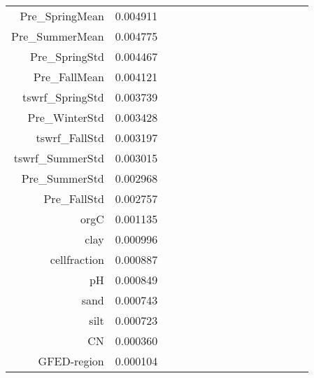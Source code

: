 \begin{table}[h]
\begin{tabular}{rrrrrrrrrrrrrrr}
Pre_SpringMean & 0.004911 \\
Pre_SummerMean & 0.004775 \\
Pre_SpringStd & 0.004467 \\
Pre_FallMean & 0.004121 \\
tswrf_SpringStd & 0.003739 \\
Pre_WinterStd & 0.003428 \\
tswrf_FallStd & 0.003197 \\
tswrf_SummerStd & 0.003015 \\
Pre_SummerStd & 0.002968 \\
Pre_FallStd & 0.002757 \\
orgC & 0.001135 \\
clay & 0.000996 \\
cellfraction & 0.000887 \\
pH & 0.000849 \\
sand & 0.000743 \\
silt & 0.000723 \\
CN & 0.000360 \\
GFED-region & 0.000104 \\
\bottomrule
\end{tabular}
\end{table}
